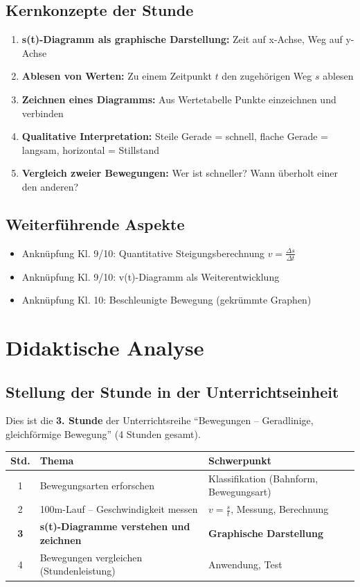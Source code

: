 \documentclass[11pt,a4paper]{article}
\newcommand{\reihenthema}{Bewegungen -- Geradlinige, gleichförmige Bewegung}
\begin{document}
\subsection{Kernkonzepte der Stunde}
\begin{enumerate}
    \item \textbf{s(t)-Diagramm als graphische Darstellung:} Zeit auf x-Achse, Weg auf y-Achse
    \item \textbf{Ablesen von Werten:} Zu einem Zeitpunkt $t$ den zugehörigen Weg $s$ ablesen
    \item \textbf{Zeichnen eines Diagramms:} Aus Wertetabelle Punkte einzeichnen und verbinden
    \item \textbf{Qualitative Interpretation:} Steile Gerade = schnell, flache Gerade = langsam, horizontal = Stillstand
    \item \textbf{Vergleich zweier Bewegungen:} Wer ist schneller? Wann überholt einer den anderen?
\end{enumerate}

\subsection{Weiterführende Aspekte}
\begin{itemize}
    \item Anknüpfung Kl. 9/10: Quantitative Steigungsberechnung $v = \frac{\Delta s}{\Delta t}$
    \item Anknüpfung Kl. 9/10: v(t)-Diagramm als Weiterentwicklung
    \item Anknüpfung Kl. 10: Beschleunigte Bewegung (gekrümmte Graphen)
\end{itemize}

\section{Didaktische Analyse}

\subsection{Stellung der Stunde in der Unterrichtseinheit}
Dies ist die \textbf{3. Stunde} der Unterrichtsreihe ``\reihenthema'' (4 Stunden gesamt).

\begin{tabular}{|c|l|l|}
\hline
\textbf{Std.} & \textbf{Thema} & \textbf{Schwerpunkt} \\
\hline
1 & Bewegungsarten erforschen & Klassifikation (Bahnform, Bewegungsart) \\
\hline
2 & 100m-Lauf -- Geschwindigkeit messen & $v = \frac{s}{t}$, Messung, Berechnung \\
\hline
\textbf{3} & \textbf{s(t)-Diagramme verstehen und zeichnen} & \textbf{Graphische Darstellung} \\
\hline
4 & Bewegungen vergleichen (Stundenleistung) & Anwendung, Test \\
\hline
\end{tabular}
\end{document}
